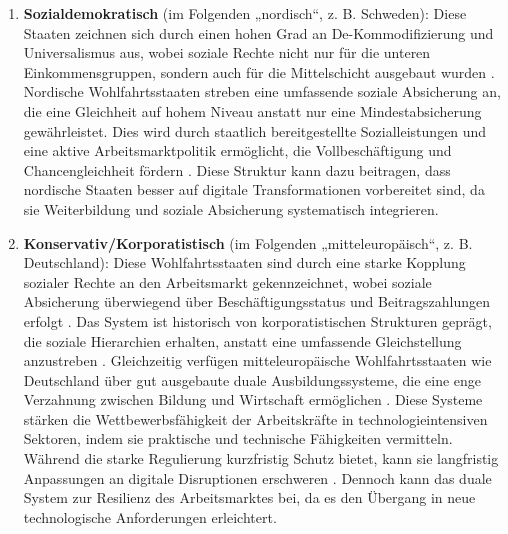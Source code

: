 \begin{enumerate}

    \item \textbf{Sozialdemokratisch} (im Folgenden „nordisch“, z. B. Schweden): Diese 
    Staaten zeichnen sich durch einen hohen Grad an De-Kommodifizierung und Universalismus 
    aus, wobei soziale Rechte nicht nur für die unteren Einkommensgruppen, sondern auch für die 
    Mittelschicht ausgebaut wurden \parencite[S. 27–28]{espingandersen1990thethree}. Nordische 
    Wohlfahrtsstaaten streben eine umfassende soziale Absicherung an, die eine Gleichheit auf 
    hohem Niveau anstatt nur eine Mindestabsicherung gewährleistet. Dies wird durch staatlich 
    bereitgestellte Sozialleistungen und eine aktive Arbeitsmarktpolitik ermöglicht, die 
    Vollbeschäftigung und Chancengleichheit fördern 
    \parencite[vgl.][S. 27–28]{espingandersen1990thethree}. Diese Struktur kann dazu 
    beitragen, dass nordische Staaten besser auf digitale Transformationen vorbereitet sind, 
    da sie Weiterbildung und soziale Absicherung systematisch integrieren.

    \item \textbf{Konservativ/Korporatistisch} (im Folgenden „mitteleuropäisch“, z. B. 
    Deutschland): Diese Wohlfahrtsstaaten sind durch eine starke Kopplung sozialer Rechte an den 
    Arbeitsmarkt gekennzeichnet, wobei soziale Absicherung überwiegend über Beschäftigungsstatus 
    und Beitragszahlungen erfolgt \parencite[S. 27]{espingandersen1990thethree}. Das System ist 
    historisch von korporatistischen Strukturen geprägt, die soziale Hierarchien erhalten,
    anstatt eine umfassende Gleichstellung anzustreben 
    \parencite[vgl.][S. 27]{espingandersen1990thethree}.  
    Gleichzeitig verfügen mitteleuropäische Wohlfahrtsstaaten wie Deutschland über gut ausgebaute 
    duale Ausbildungssysteme, die eine enge Verzahnung zwischen Bildung und Wirtschaft 
    ermöglichen \parencite[vgl.][S. 25]{hall2001varieties}. Diese Systeme stärken die 
    Wettbewerbsfähigkeit der Arbeitskräfte in technologieintensiven Sektoren, indem sie 
    praktische und technische Fähigkeiten vermitteln. Während die starke Regulierung 
    kurzfristig Schutz bietet, kann sie langfristig Anpassungen an digitale Disruptionen 
    erschweren \parencite[vgl.][S. 25–26]{hall2001varieties}. Dennoch kann das duale 
    System zur Resilienz des Arbeitsmarktes bei, da es den Übergang in neue technologische 
    Anforderungen erleichtert.


\end{enumerate}
